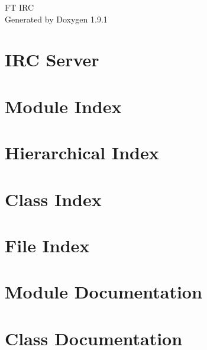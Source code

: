 \let\mypdfximage\pdfximage\def\pdfximage{\immediate\mypdfximage}\documentclass[twoside]{book}
\newcommand{\+}{\discretionary{\mbox{\scriptsize$\hookleftarrow$}}{}{}}
\newcommand{\clearemptydoublepage}{%
  \newpage{\pagestyle{empty}\cleardoublepage}%
}
\begin{document}
\raggedbottom

\hypersetup{pageanchor=false,
             bookmarksnumbered=true,
             pdfencoding=unicode
            }
\begin{titlepage}
\vspace*{7cm}
\begin{center}%
{\Large FT IRC }\\
\vspace*{1cm}
{\large Generated by Doxygen 1.9.1}\\
\end{center}
\end{titlepage}
\clearemptydoublepage
{}
\tableofcontents
\clearemptydoublepage
{}
\hypersetup{pageanchor=true}

\chapter{IRC Server}
\label{index}\hypertarget{index}{}
\chapter{Module Index}

\chapter{Hierarchical Index}

\chapter{Class Index}

\chapter{File Index}

\chapter{Module Documentation}

\chapter{Class Documentation}















\end{document}
